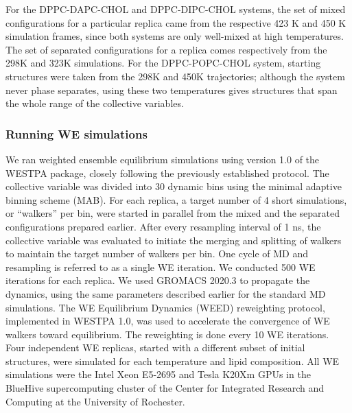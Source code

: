 \documentclass{biophys-new}
\providecommand{\DIFaddtex}[1]{{\protect\color{blue}\uwave{#1}}} %
\providecommand{\DIFaddbegin}{} %
\providecommand{\DIFaddend}{} %
\providecommand{\DIFadd}[1]{\texorpdfstring{\DIFaddtex{#1}}{#1}} %
\newcommand{\DIFaddincludegraphics}[2][]{{\color{blue}\fbox{\DIFOincludegraphics[#1]{#2}}}} %
\DeclareRobustCommand{\DIFaddbegin}{\DIFOaddbegin \let\includegraphics\DIFaddincludegraphics} %
\DeclareRobustCommand{\DIFaddend}{\DIFOaddend \let\includegraphics\DIFOincludegraphics} %
\begin{document}
For the DPPC-DAPC-CHOL and DPPC-DIPC-CHOL systems, the set of mixed configurations for a particular replica came from the respective 423 K and 450 K simulation frames, since both systems are only well-mixed at high temperatures.
The set of separated configurations for a replica comes respectively from the 298K and 323K simulations.
For the DPPC-POPC-CHOL system, starting structures were taken from the 298K and 450K trajectories; although the system never phase separates, using these two temperatures gives structures that span the whole range of the collective variables.

\subsubsection*{Running WE simulations}
We ran weighted ensemble equilibrium simulations using version 1.0 of the WESTPA package\cite{Zwier2015}, closely following the previously established protocol\cite{Bogetti2019}.
The collective variable was divided into 30 dynamic bins using the minimal adaptive binning scheme (MAB)\cite{Torrillo2021}.
For each replica, a target number of 4 short simulations, or ``walkers'' per bin, were started in parallel from the mixed and the separated configurations prepared earlier.
After every resampling interval of 1 ns, the collective variable was evaluated to initiate the merging and splitting of walkers to maintain the target number of walkers per bin. One cycle of MD and resampling is referred to as a single WE iteration.
We conducted 500 WE iterations for each replica.
We used GROMACS 2020.3 to propagate the dynamics, using the same parameters described earlier for the standard MD simulations.
The WE Equilibrium Dynamics (WEED) reweighting protocol\cite{Bhatt2010, Suarez2014}, implemented in WESTPA 1.0, was used to accelerate the convergence of WE walkers toward equilibrium.
The reweighting is done every 10 WE iterations.
Four independent WE replicas, started with a different subset of initial structures, were simulated for each temperature and lipid composition.
All WE simulations were  \DIFaddbegin \DIFadd{run using }\DIFaddend the Intel Xeon E5-2695 and Tesla K20Xm GPUs in the BlueHive supercomputing cluster of the Center for Integrated Research and Computing at the University of Rochester.
\end{document}
